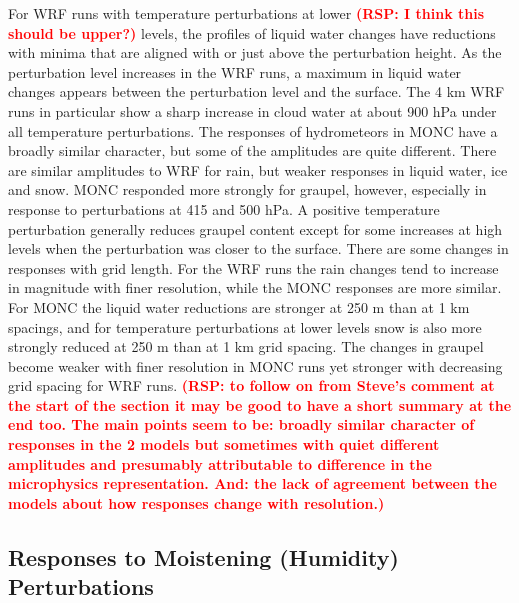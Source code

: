 \documentclass[draft]{agujournal2019}
\newcommand{\todo}[1]{\textcolor{red}{\textbf{(#1)}}}
\begin{document}
For WRF runs
with temperature perturbations at lower \todo{RSP: I think this should be upper?} levels, the profiles of liquid water
changes have reductions with minima that are aligned with or just above the
perturbation height. As the perturbation level increases in the WRF runs, a
maximum in liquid water changes appears between the perturbation level and the
surface. The 4 km WRF runs in particular show a sharp increase in cloud water at
about 900 hPa under all temperature perturbations. The responses of hydrometeors
in MONC have a broadly similar character, but some of the amplitudes are quite
different. There are similar amplitudes to WRF for rain, but weaker responses in
liquid water, ice and snow. MONC responded more strongly for graupel, however,
especially in response to perturbations at 415 and 500 hPa. A positive
temperature perturbation generally reduces graupel content except for some
increases at high levels when the perturbation was closer to the surface. There
are some changes in responses with grid length. For the WRF runs the rain
changes tend to increase in magnitude with finer resolution, while the MONC
responses are more similar. For MONC the liquid water reductions are stronger at
250 m than at 1 km spacings, and for temperature perturbations at lower levels
snow is also more strongly reduced at 250 m than at 1 km grid spacing. The
changes in graupel become weaker with finer resolution in MONC runs yet stronger
with decreasing grid spacing for WRF runs. \todo{RSP: to follow on from Steve's comment at the start of the section it may be good to have a short summary at the end too. The main points seem to be: broadly similar character of responses in the 2 models but sometimes with quiet different amplitudes and presumably attributable to difference in the microphysics representation. And: the lack of agreement between the models about how responses change with resolution.}

\subsection{Responses to Moistening (Humidity) Perturbations}
\end{document}
